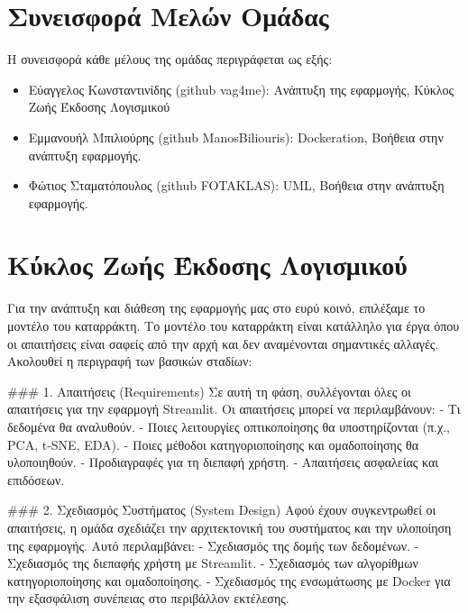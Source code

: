 \documentclass[a4paper,12pt]{article}
\begin{document}
\begin{itemize}
\section{Συνεισφορά Μελών Ομάδας}
\label{sec:contribution}
Η συνεισφορά κάθε μέλους της ομάδας περιγράφεται ως εξής:
\begin{itemize}
    \item Εύαγγελος Κωνσταντινίδης \textlatin{(github vag4me)}: Ανάπτυξη της εφαρμογής, Κύκλος Ζωής Έκδοσης Λογισμικού
    \item Εμμανουήλ Μπιλιούρης \textlatin{(github ManosBiliouris)}: \textlatin{Dockeration}, Βοήθεια στην ανάπτυξη εφαρμογής.
    \item Φώτιος Σταματόπουλος \textlatin{(github FOTAKLAS)}: \textlatin{UML}, Βοήθεια στην ανάπτυξη εφαρμογής.
\end{itemize}

\section{Κύκλος Ζωής Έκδοσης Λογισμικού}
\label{sec:software_lifecycle}
Για την ανάπτυξη και διάθεση της εφαρμογής μας στο ευρύ κοινό, επιλέξαμε το μοντέλο του καταρράκτη. Το μοντέλο του καταρράκτη είναι κατάλληλο για έργα όπου οι απαιτήσεις είναι σαφείς από την αρχή και δεν αναμένονται σημαντικές αλλαγές. Ακολουθεί η περιγραφή των βασικών σταδίων:

### 1. Απαιτήσεις (\textlatin{Requirements})
Σε αυτή τη φάση, συλλέγονται όλες οι απαιτήσεις για την εφαρμογή \textlatin{Streamlit}. Οι απαιτήσεις μπορεί να περιλαμβάνουν:
- Τι δεδομένα θα αναλυθούν.
- Ποιες λειτουργίες οπτικοποίησης θα υποστηρίζονται (π.χ., \textlatin{PCA}, \textlatin{t-SNE}, \textlatin{EDA}).
- Ποιες μέθοδοι κατηγοριοποίησης και ομαδοποίησης θα υλοποιηθούν.
- Προδιαγραφές για τη διεπαφή χρήστη.
- Απαιτήσεις ασφαλείας και επιδόσεων.



\par\vspace{10pt}

### 2. Σχεδιασμός Συστήματος (\textlatin{System Design})
Αφού έχουν συγκεντρωθεί οι απαιτήσεις, η ομάδα σχεδιάζει την αρχιτεκτονική του συστήματος και την υλοποίηση της εφαρμογής. Αυτό περιλαμβάνει:
- Σχεδιασμός της δομής των δεδομένων.
- Σχεδιασμός της διεπαφής χρήστη με \textlatin{Streamlit}.
- Σχεδιασμός των αλγορίθμων κατηγοριοποίησης και ομαδοποίησης.
- Σχεδιασμός της ενσωμάτωσης με \textlatin{Docker} για την εξασφάλιση συνέπειας στο περιβάλλον εκτέλεσης.




\end{itemize}
\end{document}
